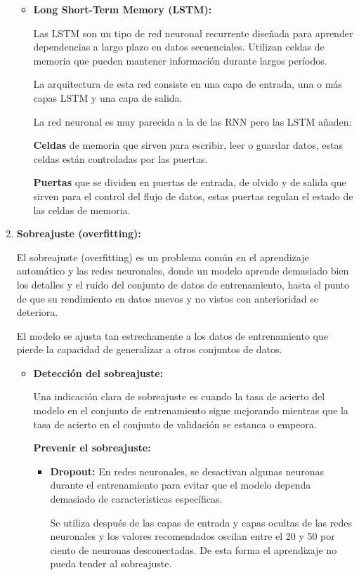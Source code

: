 \begin{enumerate}
\begin{itemize}
	\item
	\textbf{Long Short-Term Memory (LSTM):}

	Las LSTM son un tipo de red neuronal recurrente diseñada para aprender dependencias a largo plazo en datos secuenciales. Utilizan celdas de memoria que pueden mantener información durante largos períodos.
	
	La arquitectura de esta red consiste en una capa de entrada, una o más capas LSTM y una capa de salida. 
	
	La red neuronal es muy parecida a la de las RNN pero las LSTM añaden:
	
	\textbf{Celdas} de memoria que sirven para escribir, leer o guardar datos, estas celdas están controladas por las puertas.
	
	\textbf{Puertas} que se dividen en puertas de entrada, de olvido y de salida que sirven para el control del flujo de datos, estas puertas regulan el estado de las celdas de memoria.


\end{itemize}


\item
\textbf{Sobreajuste (overfitting):}

	El sobreajuste (overfitting) es un problema común en el aprendizaje automático y las redes neuronales, donde un modelo aprende demasiado bien los detalles y el ruido del conjunto de datos de entrenamiento, hasta el punto de que su rendimiento en datos nuevos y no vistos con anterioridad se deteriora. 
	
	El modelo se ajusta tan estrechamente a los datos de entrenamiento que pierde la capacidad de generalizar a otros conjuntos de datos.
	

\begin{itemize}	
\item
\textbf{Detección del sobreajuste:}

	Una indicación clara de sobreajuste es cuando la tasa de acierto del modelo en el conjunto de entrenamiento sigue mejorando mientras que la tasa de acierto en el conjunto de validación se estanca o empeora.

\textbf{Prevenir el sobreajuste:}

	\begin{itemize}
	\item
	\textbf{Dropout:}
	En redes neuronales, se desactivan algunas neuronas durante el entrenamiento para evitar que el modelo dependa demasiado de características específicas.
	
	Se utiliza después de las capas de entrada y capas ocultas de las redes neuronales y los valores recomendados oscilan entre el 20 y 50 por ciento de neuronas desconectadas. De esta forma el aprendizaje no pueda tender al sobreajuste. 
	

\end{itemize}
\end{itemize}
\end{enumerate}
